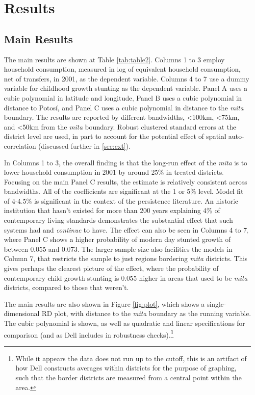 \documentclass[12pt]{article}
\begin{document}
\section{Results}

\subsection{Main Results}

The main results are shown at Table \ref{tab:table2}. Columns 1 to 3 employ household consumption, measured in log of equivalent household consumption, net of transfers, in 2001, as the dependent variable. Columns 4 to 7 use a dummy variable for childhood growth stunting as the dependent variable. Panel A uses a cubic polynomial in latitude and longitude, Panel B uses a cubic polynomial in distance to Potosí, and Panel C uses a cubic polynomial in distance to the \emph{mita} boundary. The results are reported by different bandwidths, \textless 100km, \textless 75km, and \textless 50km from the \emph{mita} boundary. Robust clustered standard errors at the district level are used, in part to account for the potential effect of spatial auto-correlation (discussed further in \ref{sec:ext}).

In Columns 1 to 3, the overall finding is that the long-run effect of the \emph{mita} is to lower household consumption in 2001 by around 25\% in treated districts. Focusing on the main Panel C results, the estimate is relatively consistent across bandwidths. All of the coefficients are significant at the 1 or 5\% level. Model fit of 4-4.5\% is significant in the context of the persistence literature. An historic institution that hasn't existed for more than 200 years explaining 4\% of contemporary living standards demonstrates the substantial effect that such systems had and \emph{continue} to have. The effect can also be seen in Columns 4 to 7, where Panel C shows a higher probability of modern day stunted growth of between 0.055 and 0.073. The larger sample size also facilities the models in Column 7, that restricts the sample to just regions bordering \emph{mita} districts. This gives perhaps the clearest picture of the effect, where the probability of contemporary child growth stunting is 0.055 higher in areas that used to be \emph{mita} districts, compared to those that weren't. 

The main results are also shown in Figure \ref{fig:plot}, which shows a single-dimensional RD plot, with distance to the \emph{mita} boundary as the running variable. The cubic polynomial is shown, as well as quadratic and linear specifications for comparison (and as Dell includes in robustness checks).\footnote{While it appears the data does not run up to the cutoff, this is an artifact of how Dell constructs averages within districts for the purpose of graphing, such that the border districts are measured from a central point within the area.}
\end{document}
